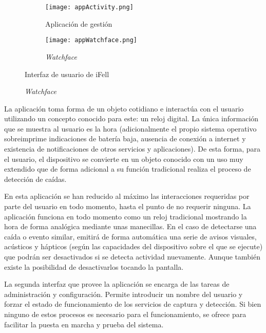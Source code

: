\begin{figure}[!ht]
  \centering
  \begin{subfigure}[b]{0.4\textwidth}
      \centering
      \texttt{[image: appActivity.png]}
      \caption{Aplicación de gestión}
      \label{fig:uiActivity}
  \end{subfigure}
  \hfill
  \begin{subfigure}[b]{0.4\textwidth}
      \centering
      \texttt{[image: appWatchface.png]}
      \caption{\textit{Watchface}}
      \label{fig:uiWatchface}
  \end{subfigure}
  \caption{\label{fig:ifell:UI} Interfaz de usuario de iFell}
\iffalse
\subfloat{\label{fig:uiActivity} Aplicación de gestión}{\texttt{[image: appActivity.png]}}
     \caption{\label{fig:uiApps} Interfaces de usuario}
     \hfill
\subfloat{\label{fig:uiWatchface} Watchface}{\texttt{[image: appWatchface.png]}}
\fi
\end{figure}


La aplicación toma forma de un objeto cotidiano e interactúa con el usuario utilizando un concepto conocido para este: un reloj digital. La única información que se muestra al usuario es la hora (adicionalmente el propio sistema operativo sobreimprime indicaciones de batería baja, ausencia de conexión a internet y existencia de notificaciones de otros servicios y aplicaciones). De esta forma, para el usuario, el dispositivo se convierte en un objeto conocido con un uso muy extendido que de forma adicional a su función tradicional realiza el proceso de detección de caídas.

En esta aplicación se han reducido al máximo las interacciones requeridas por parte del usuario en todo momento, hasta el punto de no requerir ninguna. La aplicación funciona en todo momento como un reloj tradicional mostrando la hora de forma analógica mediante unas manecillas. En el caso de detectarse una caída o evento similar, emitirá de forma automática una serie de avisos visuales, acústicos y hápticos (según las capacidades del dispositivo sobre el que se ejecute) que podrán ser desactivados si se detecta actividad nuevamente. Aunque también existe la posibilidad de desactivarlos tocando la pantalla.

La segunda interfaz que provee la aplicación se encarga de las tareas de administración y configuración. Permite introducir un nombre del usuario y forzar el estado de funcionamiento de los servicios de captura y detección. Si bien ninguno de estos procesos es necesario para el funcionamiento, se ofrece para facilitar la puesta en marcha y prueba del sistema.

